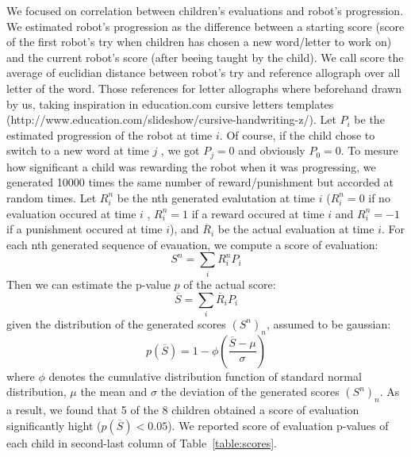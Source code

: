 \documentclass{sig-alternate}
\begin{document}
We focused on correlation between children's evaluations and robot's progression.
We estimated robot's progression as the difference between a starting score
(score of the first robot's try when children has chosen a new word/letter to
work on) and the current robot's score (after beeing taught by the child). We call score the average of euclidian
distance between robot's try and reference allograph over all letter of the
word. Those references for letter allographs where beforehand drawn by
us, taking inspiration in education.com cursive letters templates
(http://www.education.com/slideshow/cursive-handwriting-z/). Let $P_i$ be the
estimated progression of the robot at time $ i$. Of course, if the child
chose to switch to a new word at time $ j$ , we got $ P_{j}=0$ and obviously $
P_0=0$.
To mesure how significant a child was rewarding the robot when it was
progressing, we generated 10000 times the same number of reward/punishment
but accorded at random times. Let $ R_i^n$ be the nth generated evalutation at
time $ i$ ($ R_i^n = 0$ if
no evaluation occured at time $ i$ , $ R_i^n=1$ if a reward occured at time
$i$ and $R_i^n=-1$ if a punishment occured at time $i$), and $\overline{R}_i$ be the
actual evaluation at time $i$. For each nth generated sequence of evauation, we
compute a score of evaluation: $$ S^n = \sum\limits_i{R_i^n P_i}$$ 
Then we can estimate the p-value $p$ of the actual score: $$ \overline{S} =
\sum\limits_i{\overline{R}_i P_i}$$ 
given the distribution of the generated scores $\left(S^n\right)_n$, assumed to
be gaussian: 
$$p(\overline{S}) = 1-\phi{\left(\frac{\overline{S}-\mu}{\sigma}\right)}$$
where $\phi$ denotes the cumulative distribution function of standard normal
distribution, $\mu$ the mean and $\sigma$ the deviation of the generated 
scores $\left(S^n\right)_n$. 
As a result, we found that 5 of the 8 children obtained a score of evaluation
significantly hight ($p(\overline{S})<0.05$). We reported score of evaluation
p-values of each child in second-last column of Table~\ref{table:scores}.
\end{document}
